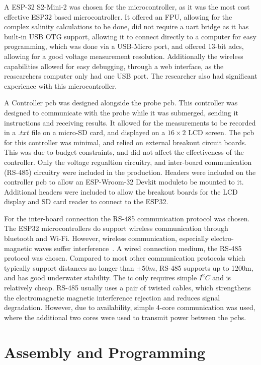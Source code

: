 A ESP-32 S2-Mini-2 was chosen for the microcontroller, as it was the most cost effective ESP32 based microcontroller.
It offered an FPU, allowing for the complex salinity calculations to be done, did not require a \gls{uart} bridge as it has built-in USB OTG support, allowing it to connect directly to a computer for easy programming, which was done via a USB-Micro port, and offered 13-bit \gls{adc}s, allowing for a good voltage measurement resolution.
Additionally the wireless capabilities allowed for easy debugging, through a web interface, as the reasearchers computer only had one USB port.
The researcher also had significant experience with this microcontroller.

A Controller \gls{pcb} was designed alongside the probe \gls{pcb}.
This controller was designed to communicate with the probe while it was submerged, sending it instructions and receiving results.
It allowed for the measurements to be recorded in a $.txt$ file on a micro-SD card, and displayed on a $16\times2$ LCD screen.
The \gls{pcb} for this controller was minimal, and relied on external breakout circuit boards.
This was due to budget constraints, and did not affect the effectiveness of the controller.
Only the voltage regualtion circuitry, and inter-board communication (RS-485) circuitry were included in the production.
Headers were included on the controller \gls{pcb} to allow an ESP-Wroom-32 Devkit moduleto be mounted to it.
Additional headers were included to allow the breakout boards for the LCD display and SD card reader to connect to the ESP32. 

For the inter-board connection the RS-485 communication protocol was chosen.
The ESP32 microcontrollers do support wireless communication through bluetooth and Wi-Fi.
However, wireless communication, especially electro-magnetic waves suffer interference~\cite{waves_in_water}.
A wired connection medium, the RS-485 protocol was chosen. 
Compared to most other communication protocols which typically support distances no longer than $\pm50m$, RS-485 supports up to 1200m, and has good underwater stability.
The \gls{ic} only requires simple $I^2C$ and is relatively cheap.
RS-485 usually uses a pair of twisted cables, which strengthens the electromagnetic magnetic interference rejection and reduces signal degradation.
However, due to availability, simple 4-core communication was used, where the additional two cores were used to transmit power between the \gls{pcb}s.

\section{Assembly and Programming}
